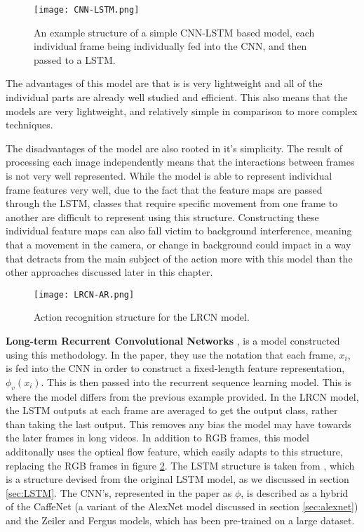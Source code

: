 \begin{figure}[ht]
	\texttt{[image: CNN-LSTM.png]}
	\centering
	\caption{An example structure of a simple CNN-LSTM based model, each individual frame being individually fed into the CNN, and then passed to a LSTM.}
	\label{fig:cnn-lstm}
\end{figure}

The advantages of this model are that is is very lightweight and all of the individual parts are already well studied and efficient. This also means that the models are very lightweight, and relatively simple in comparison to more complex techniques.

The disadvantages of the model are also rooted in it's simplicity. The result of processing each image independently means that the interactions between frames is not very well represented. While the model is able to represent individual frame features very well, due to the fact that the feature maps are passed through the LSTM, classes that require specific movement from one frame to another are difficult to represent using this structure. Constructing these individual feature maps can also fall victim to background interference, meaning that a movement in the camera, or change in background could impact in a way that detracts from the main subject of the action more with this model than the other approaches discussed later in this chapter.

\begin{figure}[ht]
	\texttt{[image: LRCN-AR.png]}
	\centering
	\caption{Action recognition structure for the LRCN model. \cite{LRCNS}}
	\label{fig:lrcn-ar}
\end{figure}

\textbf{Long-term Recurrent Convolutional Networks} \cite{LRCNS}, is a model constructed using this methodology. In the paper, they use the notation that each frame, $x_{i}$, is fed into the CNN in order to construct a fixed-length feature representation, $\phi_{v}(x_{i})$. This is then passed into the recurrent sequence learning model. This is where the model differs from the previous example provided. In the LRCN model, the LSTM outputs at each frame are averaged to get the output class, rather than taking the last output. This removes any bias the model may have towards the later frames in long videos. In addition to RGB frames, this model additonally uses the optical flow feature, which easily adapts to this structure, replacing the RGB frames in figure \ref{fig:lrcn-ar}. The LSTM structure is taken from \cite{LSTM-2015}, which is a structure devised from the original LSTM model, as we discussed in section \ref{sec:LSTM}. The CNN's, represented in the paper as $\phi$, is described as a hybrid of the CaffeNet \cite{caffenet} (a variant of the AlexNet \cite{alexnet} model discussed in section \ref{sec:alexnet}) and the Zeiler and Fergus \cite{zeilerfergus} models, which has been pre-trained on a large dataset.


